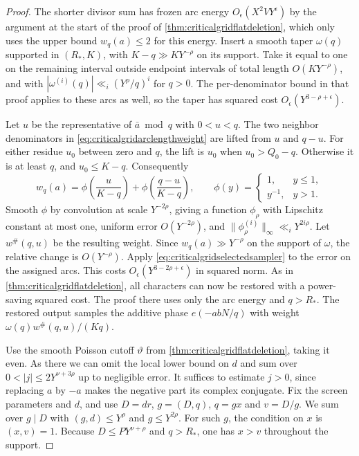 \documentclass[11pt,a4paper]{article}
\numberwithin{equation}{section}
\begin{document}
\begin{proof}
The shorter divisor sum has frozen arc energy
$O_\epsilon(X^2 VY^\epsilon)$ by the argument at the start
of the proof of \cref{thm:criticalgridflatdeletion}, which
only uses the upper bound $w_q(a)\le2$ for this energy.
Insert a smooth taper $\omega(q)$ supported in $(R_*,K)$,
with $K-q\gg K Y^{-\rho}$ on its support. Take it equal
to one on the remaining interval outside endpoint intervals
of total length $O(KY^{-\rho})$, and with
$|\omega^{(i)}(q)|\ll_i (Y^\rho/q)^i$ for $q>0$.
The per-denominator bound in that proof applies to these
arcs as well, so the taper has squared cost
$O_\epsilon(Y^{3-\rho+\epsilon})$.

Let $u$ be the representative of $\bar a\bmod q$ with
$0<u<q$. The two neighbor denominators in
\cref{eq:criticalgridarclengthweight} are lifted from
$u$ and $q-u$. For either residue $u_0$ between zero and
$q$, the lift is $u_0$ when $u_0>Q_0-q$. Otherwise it
is at least $q$, and $u_0\le K-q$. Consequently
\begin{equation}
 w_q(a)=\phi\!\left(\frac{u}{K-q}\right)
        +\phi\!\left(\frac{q-u}{K-q}\right),
 \qquad
 \phi(y)=
 \begin{cases}
  1,&y\le1,\\
  y^{-1},&y>1 .
 \end{cases}
 \label{eq:criticalgridclippedweight}
\end{equation}
Smooth $\phi$ by convolution at scale $Y^{-2\rho}$,
giving a function $\phi_\rho$ with Lipschitz
constant at most one, uniform error $O(Y^{-2\rho})$,
and $\|\phi_\rho^{(i)}\|_\infty\ll_i Y^{2i\rho}$.
Let $w^\#(q,u)$ be the resulting weight.
Since $w_q(a)\gg Y^{-\rho}$ on the support of $\omega$,
the relative change is $O(Y^{-\rho})$.
Apply \cref{eq:criticalgridselectedsampler} to the error on
the assigned arcs. This costs $O_\epsilon(Y^{3-2\rho+\epsilon})$
in squared norm. As in \cref{thm:criticalgridflatdeletion},
all characters can now be restored with a power-saving
squared cost. The proof there uses only the arc energy
and $q>R_*$. The restored output samples the additive
phase $e(-a bN/q)$ with weight $\omega(q)w^\#(q,u)/(Kq)$.

Use the smooth Poisson cutoff $\vartheta$ from
\cref{thm:criticalgridflatdeletion}, taking it even.
As there we can omit the local lower bound on $d$ and sum
over $0<|j|\le 2Y^{\nu+3\rho}$ up to negligible error.
It suffices to estimate $j>0$, since replacing $a$ by
$-a$ makes the negative part its complex conjugate.
Fix the screen parameters and $d$, and use
$D=dr$, $g=(D,q)$, $q=g x$ and $v=D/g$.
We sum over $g\mid D$ with $(g,d)\le Y^\rho$ and
$g\le Y^{2\rho}$. For such $g$, the condition on $x$
is $(x,v)=1$. Because $D\le P Y^{\nu+\rho}$ and
$q>R_*$, one has $x>v$ throughout the support.


\end{proof}
\end{document}
